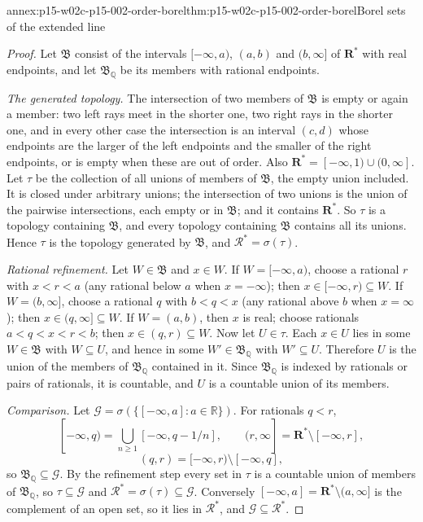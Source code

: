 \begin{annexitem}{annex:p15-w02c-p15-002-order-borel}{thm:p15-w02c-p15-002-order-borel}{Borel sets of the extended line}
\begin{proof}
Let \(\mathfrak B\) consist of the intervals \([-\infty,a)\), \((a,b)\)
and \((b,\infty]\) of \(\mathbf R^*\) with real endpoints, and let
\(\mathfrak B_{\mathbb Q}\) be its members with rational endpoints.

\emph{The generated topology.} The intersection of two members of
\(\mathfrak B\) is empty or again a member: two left rays meet in the
shorter one, two right rays in the shorter one, and in every other case
the intersection is an interval \((c,d)\) whose endpoints are the larger
of the left endpoints and the smaller of the right endpoints, or is empty
when these are out of order. Also
\(\mathbf R^*=[-\infty,1)\cup(0,\infty]\). Let \(\tau\) be the collection
of all unions of members of \(\mathfrak B\), the empty union included. It
is closed under arbitrary unions; the intersection of two unions is the
union of the pairwise intersections, each empty or in \(\mathfrak B\); and
it contains \(\mathbf R^*\). So \(\tau\) is a topology containing
\(\mathfrak B\), and every topology containing \(\mathfrak B\) contains all
its unions. Hence \(\tau\) is the topology generated by \(\mathfrak B\),
and \(\mathcal R^*=\sigma(\tau)\).

\emph{Rational refinement.} Let \(W\in\mathfrak B\) and \(x\in W\). If
\(W=[-\infty,a)\), choose a rational \(r\) with \(x<r<a\) (any rational
below \(a\) when \(x=-\infty\)); then \(x\in[-\infty,r)\subseteq W\). If
\(W=(b,\infty]\), choose a rational \(q\) with \(b<q<x\) (any rational
above \(b\) when \(x=\infty\)); then \(x\in(q,\infty]\subseteq W\). If
\(W=(a,b)\), then \(x\) is real; choose rationals \(a<q<x<r<b\); then
\(x\in(q,r)\subseteq W\). Now let \(U\in\tau\). Each \(x\in U\) lies in
some \(W\in\mathfrak B\) with \(W\subseteq U\), and hence in some
\(W'\in\mathfrak B_{\mathbb Q}\) with \(W'\subseteq U\). Therefore \(U\) is
the union of the members of \(\mathfrak B_{\mathbb Q}\) contained in it.
Since \(\mathfrak B_{\mathbb Q}\) is indexed by rationals or pairs of
rationals, it is countable, and \(U\) is a countable union of its members.

\emph{Comparison.} Let \(\mathcal G=\sigma(\{[-\infty,a]:a\in\mathbb R\})\).
For rationals \(q<r\),
\[
 [-\infty,q)=\bigcup_{n\geq1}[-\infty,q-1/n],\qquad
 (r,\infty]=\mathbf R^*\setminus[-\infty,r],
\]
\[
 (q,r)=[-\infty,r)\setminus[-\infty,q],
\]
so \(\mathfrak B_{\mathbb Q}\subseteq\mathcal G\). By the refinement step
every set in \(\tau\) is a countable union of members of
\(\mathfrak B_{\mathbb Q}\), so \(\tau\subseteq\mathcal G\) and
\(\mathcal R^*=\sigma(\tau)\subseteq\mathcal G\). Conversely
\([-\infty,a]=\mathbf R^*\setminus(a,\infty]\) is the complement of an open
set, so it lies in \(\mathcal R^*\), and \(\mathcal G\subseteq\mathcal R^*\).


\end{proof}
\end{annexitem}
